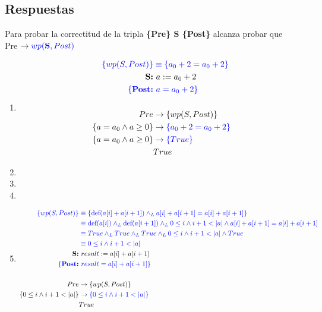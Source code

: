 \documentclass{article}
\begin{document}
\subsection*{Respuestas}
Para probar la correctitud de la tripla \textbf{\{Pre\} S \{Post\}} alcanza probar que\\
\hspace*{40mm}Pre $\rightarrow \color{blue}wp(\textbf{S},Post)$
\begin{enumerate}[label=\alph*)]
	\item
		\begin{align*}
		\color{blue}\{wp(S,Post)\} &\color{blue}
			\equiv \{a_0+2=a_0+2\}\\
		\textbf{S:} &\  a := a_0 + 2\\
		\color{blue}\{\textbf{Post:} &\color{blue}\  a = a_0 + 2\}\\
		\\
		Pre &\rightarrow \{wp(S,Post)\}\\
		\{a = a_0 \wedge a \geq 0\}&\rightarrow \color{blue}\{a_0+2=a_0+2\}\\
		\{a = a_0 \wedge a \geq 0\}&\rightarrow \color{blue}\{True\}\\
		& True 
		\end{align*}
	\item
	\item
	\item
	\item
		\begin{align*}
		\color{blue}\{wp(S,Post)\} \color{blue}
			&\color{blue} \equiv \{\textrm{def}(a[i] + a[i + 1])
				\wedge_L a[i] + a[i + 1]=a[i] + a[i + 1] \}\\
			&\color{blue} \equiv \textrm{def}(a[i]) \wedge_L
				 \textrm{def}(a[i + 1]) \wedge_L 0\leq i \wedge i+1<|a|
				  \wedge a[i] + a[i + 1]=a[i] + a[i + 1]\\
			&\color{blue} \equiv True \wedge_L
				 True \wedge_L True \wedge_L 0\leq i \wedge i+1<|a|
				  \wedge True\\
			&\color{blue} \equiv 0\leq i \wedge i+1<|a| \\	  
		\textbf{S:} &\  result := a[i] + a[i + 1]\\
		\color{blue}\{\textbf{Post:} &\color{blue}\  result = a[i] + a[i + 1]\}\\
		\\
		Pre &\rightarrow \{wp(S,Post)\}\\
		\{0 \leq i \wedge i + 1 < |a|\}&\rightarrow \color{blue}\{0\leq i \wedge i+1<|a|\}\\
		& True 
		\end{align*}
\end{enumerate}
                                                            
\end{document}
